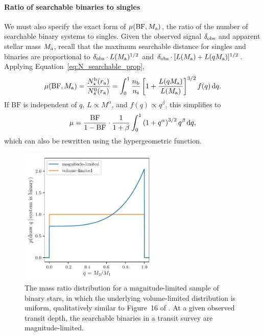 \documentclass[12pt,modern]{aastex61}
\renewcommand{\a}{_{\rm a}}
\begin{document}
\paragraph{Ratio of searchable binaries to singles}
We must also specify the exact form of $\mu({\rm BF},M\a)$, the ratio of 
the number of searchable binary systems to singles.
Given the observed signal $\delta_{\rm obs}$ and apparent stellar mass $M\a$, 
recall that the maximum searchable distance for singles and binaries are 
proportional to $\delta_{\rm obs}\cdot L(M\a)^{1/2}$ and $\delta_{\rm 
obs}\cdot [L(M\a)+L(qM\a)]^{1/2}$.
Applying Equation~\ref{eq:N_searchable_prop},
\begin{equation}
\mu({\rm BF},M\a) = 
\frac{N_\star^{\rm b}(r\a)}{N_s^0(r\a)}=
\int_0^1 {n_{\rm b}\over n_{\rm s}}\left[1+{L(qM\a) \over L(M\a)}\right]^{3/2} 
f(q)\,\mathrm{d}q.
\label{eq:mu_general}
\end{equation}
If $\mathrm{BF}$ is independent of $q$, $L \propto M^\alpha$, and $f(q) 
\propto q^\beta$, this simplifies to
\begin{equation}
\mu =\frac{{\rm BF}}{1 - {\rm BF}}\cdot {1\over{1+\beta}}\int_0^1 
\left(1+q^\alpha\right)^{3/2} q^\beta \,\mathrm{d}q,
\label{eq:mu_power_laws}
\end{equation}
which can also be rewritten using the hypergeometric function.

\begin{figure}[!tb]
    \centering
    \includegraphics[width=0.6\textwidth]{figures/mass_ratio_distribution.pdf}
    \caption{
        The mass ratio distribution for a magnitude-limited sample of 
        binary stars, in which the underlying volume-limited distribution is 
        uniform, qualitatively similar to
        Figure~16 of \citet{raghavan_survey_2010}.
        At a given observed transit depth, the searchable binaries in a 
        transit survey are magnitude-limited.
    }
    \label{fig:q_distribn_mag_limited}
\end{figure}
\end{document}
